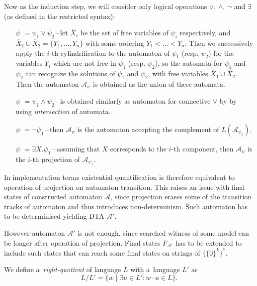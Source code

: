 Now as the induction step, we will consider only logical operations $\vee$,
$\wedge$, $\neg$ and $\exists$ (as defined in the restricted syntax):
\begin{itemize}
 \item[$\psi$]$ = \psi_1 \vee \psi_2$\,--\,let $\overline{X}_i$ be the set of
 free variables of $\psi_i$ respectively, and $\overline{X}_1 \cup
 \overline{X}_2 = \{Y_1,\ldots,Y_n\}$ with some ordering $Y_1 < \ldots < Y_n$.
 Then we successively apply the $i$-th cylindrification to the automaton of
 $\psi_1$ (resp. $\psi_2$) for the variables $Y_i$ which are not free in
 $\psi_1$ (resp. $\psi_2$), so the automata for $\psi_1$ and $\psi_2$ can
 recognize the solutions of $\psi_1$ and $\psi_2$, with free variables
 $\overline{X}_1 \cup \overline{X}_2$. Then the automaton $\mathcal{A}_\psi$ is
 obtained as the union of these automata.
 \item[$\psi$]$ = \psi_1 \wedge \psi_2$\,--\,is obtained similarly as automaton
 for connective $\vee$ by by using \emph{intersection} of automata.
 \item[$\psi$]$ = \neg\psi_1$\,--\,then $\mathcal{A}_\psi$ is the automaton
 accepting the complement of $L(\mathcal{A}_{\psi_1})$.
 \item[$\psi$]$ = \exists X.\psi_1$\,--\,assuming that $X$ corresponds to the
 $i$-th component, then $\mathcal{A}_\psi$ is the $i$-th projection of
 $\mathcal{A}_{\psi_1}$.
\end{itemize}

In implementation terms existential quantification is therefore equivalent to
operation of projection on automaton transition. This raises an issue with final
states of constructed automaton $\mathcal{A}$, since projection erases some of
the transition tracks of automaton and thus introduces non-determinism. Such automaton has to
be determinised yielding DTA $\mathcal{A}'$.

However automaton $\mathcal{A}'$ is not enough, since searched witness of some
model can be longer after operation of projection. Final states
$F_{\mathcal{A}'}$ has to be extended to include such states that can reach some
final states on strings of $\{\{0\}^k\}^*$. 

\begin{defz}
We define a~\emph{right-quotient} of language $L$ with a~language $L'$ as
\begin{equation}
 L / L' = \{w \mid \exists u \in L' : w\cdot u \in L\}.
\end{equation}
\end{defz}

